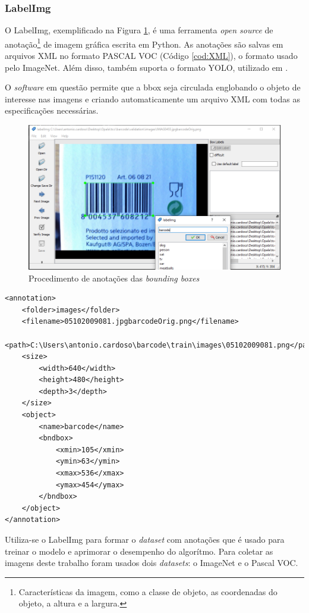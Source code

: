 \subsubsection{LabelImg}\label{sub:LabelImg}

O LabelImg, exemplificado na Figura \ref{fig:labelimg}, é uma ferramenta \textit{open source} de anotação\footnote{Características da imagem, como a classe de objeto, as coordenadas do objeto, a altura e a largura.} de imagem gráfica escrita em Python. As anotações são salvas em arquivos XML no formato PASCAL VOC (Código \ref{cod:XML}), o formato usado pelo ImageNet. Além disso, também suporta o formato YOLO, utilizado em \citeauthor{labelimg}.

O \textit{software} em questão permite que a bbox seja circulada englobando o objeto de interesse nas imagens e criando automaticamente um arquivo XML com todas as especificações necessárias.

\begin{figure}[H]
	\centering
	\includegraphics[width=0.7\linewidth]{figuras/MachineLearning/labelimg.png}
	\caption{Procedimento de anotações das \textit{bounding boxes}}
	\label{fig:labelimg}
\end{figure}
\begin{lstlisting}[caption=Arquivo XML gerado pelo LabelImg, label=cod:XML]
<annotation>
	<folder>images</folder>
	<filename>05102009081.jpgbarcodeOrig.png</filename>
	<path>C:\Users\antonio.cardoso\barcode\train\images\05102009081.png</path>
	<size>
		<width>640</width>
		<height>480</height>
		<depth>3</depth>
	</size>
	<object>
		<name>barcode</name>
		<bndbox>
			<xmin>105</xmin>
			<ymin>63</ymin>
			<xmax>536</xmax>
			<ymax>454</ymax>
		</bndbox>
	</object>
</annotation>
\end{lstlisting}

Utiliza-se o LabelImg para formar o \textit{dataset} com anotações que é usado para treinar o modelo e aprimorar o desempenho do algorítmo. Para coletar as imagens deste trabalho foram usados dois \textit{datasets}: o ImageNet e o Pascal VOC.


